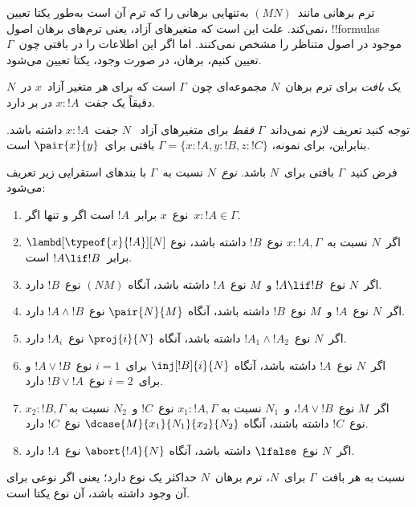 \documentclass[../../../include/open-logic-section]{subfiles}
\begin{document}


ترم برهانی مانند~$(MN)$ به‌تنهایی برهانی را که ترم آن است به‌طور یکتا
تعیین نمی‌کند. علت این است که متغیرهای آزاد، یعنی ترم‌های برهان اصول،
!!{formula}s موجود در اصول متناظر را مشخص نمی‌کنند. اما اگر این
اطلاعات را در بافتی چون~$\Gamma$ تعیین کنیم، برهان، در صورت وجود،
یکتا تعیین می‌شود.

\begin{defn}
یک \emph{بافت} برای ترم برهان~$N$ مجموعه‌ای چون~$\Gamma$ است که برای
هر متغیر آزاد~$x$ در~$N$ دقیقاً یک جفت~$x:!A$ در بر دارد.
\end{defn}

توجه کنید تعریف لازم نمی‌داند~$\Gamma$ \emph{فقط} برای متغیرهای آزاد
~$N$ جفت~$x:!A$ داشته باشد. بنابراین، برای نمونه،
$\Gamma=\{x:!A,y:!B,z:!C\}$ بافتی برای~$\pair{x}{y}$ است.

\begin{defn}
  فرض کنید~$\Gamma$ بافتی برای~$N$ باشد. \emph{نوع}~$N$ نسبت
  به~$\Gamma$ با بندهای استقرایی زیر تعریف می‌شود:
  \begin{enumerate}
  \item نوع~$x$ برابر~$!A$ است اگر و تنها اگر~$x:!A \in \Gamma$.
  \item اگر~$N$ نسبت به~$x:!A,\Gamma$ نوع~$!B$ داشته باشد، نوع
    $\lambd[\typeof{x}{!A}][N]$ برابر~$!A \lif !B$ است.
  \item اگر~$N$ نوع~$!A \lif !B$ و~$M$ نوع~$!A$ داشته باشد، آنگاه
    $(NM)$ نوع~$!B$ دارد.
  \item اگر~$N$ نوع~$!A$ و~$M$ نوع~$!B$ داشته باشد، آنگاه
    $\pair{N}{M}$ نوع~$!A \land !B$ دارد.
  \item اگر~$N$ نوع~$!A_1 \land !A_2$ داشته باشد، آنگاه
    $\proj{i}{N}$ نوع~$!A_i$ دارد.
  \item اگر~$N$ نوع~$!A$ داشته باشد، آنگاه
    $\inj[!B]{i}{N}$ برای~$i=1$ نوع~$!A \lor !B$ و برای~$i=2$
    نوع~$!B \lor !A$ دارد.
  \item اگر~$M$ نوع~$!A \lor !B$، و~$N_1$ نسبت به
    $x_1:!A,\Gamma$ نوع~$!C$ و~$N_2$ نسبت به
    $x_2:!B,\Gamma$ نوع~$!C$ داشته باشند، آنگاه
    $\dcase{M}{x_1}{N_1}{x_2}{N_2}$ نوع~$!C$ دارد.
  \item اگر~$N$ نوع~$\lfalse$ داشته باشد، آنگاه
    $\abort{!A}{N}$ نوع~$!A$ دارد.
  \end{enumerate}
\end{defn}

\begin{prop}
نسبت به هر بافت~$\Gamma$ برای~$N$، ترم برهان~$N$ حداکثر یک نوع دارد؛
یعنی اگر نوعی برای آن وجود داشته باشد، آن نوع یکتا است.
\end{prop}
\end{document}
